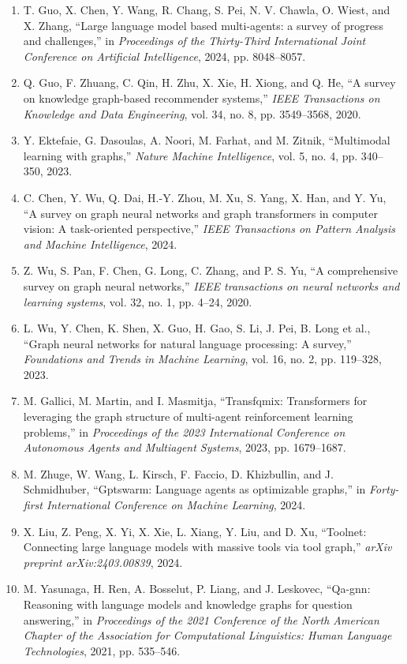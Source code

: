 \documentclass[10pt,UTF8,fontset=fandol]{ctexart}
\begin{document}
\begin{enumerate}[leftmargin=2.4em,labelsep=0.4em,itemsep=0.15em]
\item T. Guo, X. Chen, Y. Wang, R. Chang, S. Pei, N. V. Chawla, O. Wiest, and X. Zhang, ``Large language model based multi-agents: a survey of progress and challenges,'' in \textit{Proceedings of the Thirty-Third International Joint Conference on Artificial Intelligence}, 2024, pp. 8048--8057.
\item Q. Guo, F. Zhuang, C. Qin, H. Zhu, X. Xie, H. Xiong, and Q. He, ``A survey on knowledge graph-based recommender systems,'' \textit{IEEE Transactions on Knowledge and Data Engineering}, vol. 34, no. 8, pp. 3549--3568, 2020.
\item Y. Ektefaie, G. Dasoulas, A. Noori, M. Farhat, and M. Zitnik, ``Multimodal learning with graphs,'' \textit{Nature Machine Intelligence}, vol. 5, no. 4, pp. 340--350, 2023.
\item C. Chen, Y. Wu, Q. Dai, H.-Y. Zhou, M. Xu, S. Yang, X. Han, and Y. Yu, ``A survey on graph neural networks and graph transformers in computer vision: A task-oriented perspective,'' \textit{IEEE Transactions on Pattern Analysis and Machine Intelligence}, 2024.
\item Z. Wu, S. Pan, F. Chen, G. Long, C. Zhang, and P. S. Yu, ``A comprehensive survey on graph neural networks,'' \textit{IEEE transactions on neural networks and learning systems}, vol. 32, no. 1, pp. 4--24, 2020.
\item L. Wu, Y. Chen, K. Shen, X. Guo, H. Gao, S. Li, J. Pei, B. Long et al., ``Graph neural networks for natural language processing: A survey,'' \textit{Foundations and Trends in Machine Learning}, vol. 16, no. 2, pp. 119--328, 2023.
\item M. Gallici, M. Martin, and I. Masmitja, ``Transfqmix: Transformers for leveraging the graph structure of multi-agent reinforcement learning problems,'' in \textit{Proceedings of the 2023 International Conference on Autonomous Agents and Multiagent Systems}, 2023, pp. 1679--1687.
\item M. Zhuge, W. Wang, L. Kirsch, F. Faccio, D. Khizbullin, and J. Schmidhuber, ``Gptswarm: Language agents as optimizable graphs,'' in \textit{Forty-first International Conference on Machine Learning}, 2024.
\item X. Liu, Z. Peng, X. Yi, X. Xie, L. Xiang, Y. Liu, and D. Xu, ``Toolnet: Connecting large language models with massive tools via tool graph,'' \textit{arXiv preprint arXiv:2403.00839}, 2024.
\item M. Yasunaga, H. Ren, A. Bosselut, P. Liang, and J. Leskovec, ``Qa-gnn: Reasoning with language models and knowledge graphs for question answering,'' in \textit{Proceedings of the 2021 Conference of the North American Chapter of the Association for Computational Linguistics: Human Language Technologies}, 2021, pp. 535--546.

\end{enumerate}
\end{document}
